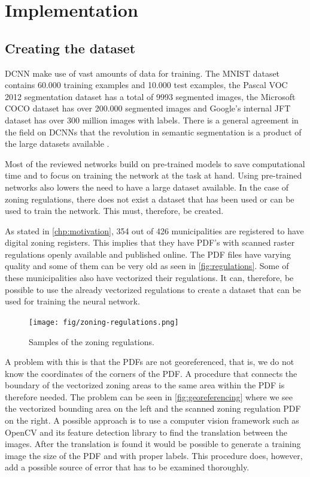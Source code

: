 \chapter{Implementation}

\section{Creating the dataset}\label{chp:dataset}
DCNN make use of vast amounts of data for training. The MNIST dataset contains 60.000 training examples and 10.000 test examples, the Pascal VOC 2012 segmentation dataset \cite{PASCALVOC2012} has a total of 9993 segmented images, the Microsoft COCO dataset \cite{Lin2014} has over 200.000 segmented images and Google's internal JFT dataset \cite{Hinton2015} has over 300 million images with labels. There is a general agreement in the field on DCNNs that the revolution in semantic segmentation is a product of the large datasets available \cite{Sun2017}.

Most of the reviewed networks build on pre-trained models to save computational time and to focus on training the network at the task at hand. Using pre-trained networks also lowers the need to have a large dataset available. In the case of zoning regulations, there does not exist a dataset that has been used or can be used to train the network. This must, therefore, be created.

As stated in \autoref{chp:motivation}, 354 out of 426 municipalities are registered to have digital zoning registers. This implies that they have PDF's with scanned raster regulations openly available and published online. The PDF files have varying quality and some of them can be very old as seen in \autoref{fig:regulations}. Some of these municipalities also have vectorized their regulations. It can, therefore, be possible to use the already vectorized regulations to create a dataset that can be used for training the neural network.

\begin{figure}[H]
    \centering
    \texttt{[image: fig/zoning-regulations.png]}
    \caption{Samples of the zoning regulations.}
    \label{fig:regulations}
\end{figure}

A problem with this is that the PDFs are not georeferenced, that is, we do not know the coordinates of the corners of the PDF. A procedure that connects the boundary of the vectorized zoning areas to the same area within the PDF is therefore needed. The problem can be seen in \autoref{fig:georeferencing} where we see the vectorized bounding area on the left and the scanned zoning regulation PDF on the right. A possible approach is to use a computer vision framework such as OpenCV \cite{OpenVCTeam2017} and its feature detection library to find the translation between the images. After the translation is found it would be possible to generate a training image the size of the PDF and with proper labels. This procedure does, however, add a possible source of error that has to be examined thoroughly.

